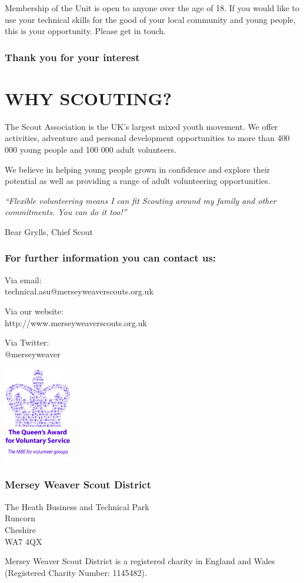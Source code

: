 \documentclass[12pt,foldmark]{leaflet}
\begin{document}
Membership of the Unit is open to anyone over the age of 18. If you would like to use your technical skills for the good of your local community and young people, this is your opportunity. Please get in touch.
\vfill
\subsubsection{Thank you for your interest}
\newpage

\withrotationtrue
\section{WHY SCOUTING?}
\withrotationfalse
The Scout Association is the UK's largest mixed youth movement. We offer activities, adventure and personal development opportunities to more than 400 000 young people and 100 000 adult volunteers.

We believe in helping young people grown in confidence and explore their potential as well as providing a range of adult volunteering opportunities.
\vfill
\epigraph{\textit{``Flexible volunteering means I can fit Scouting around my family and other commitments. You can do it too!''}}{Bear Grylls, Chief Scout}

\newpage

\null
\vfill
\subsubsection{For further information you can contact us:}
Via email:\\
technical.asu@merseyweaverscouts.org.uk

Via our website:\\
http://www.merseyweaverscouts.org.uk

Via Twitter:\\
@merseyweaver
\newpage

\hfill\includegraphics[width=3cm]{../img/qafvs}\\

\subsubsection{Mersey Weaver Scout District}
The Heath Business and Technical Park\\
Runcorn\\
Cheshire\\
WA7 4QX\\

\vspace{2cm}

{\small Mersey Weaver Scout District is a registered charity in England and Wales (Registered Charity Number: 1145482).}
\end{document}
